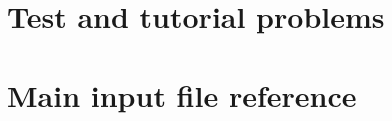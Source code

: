 \documentclass[12pt,a4paper]{report}
\begin{document}
\chapter{Test and tutorial problems}


\chapter{Main input file reference}



%
%

\def\AddDoc#1{}

\newenvironment{RecordType}[5]
{
 \ifstrequal{#4}{\relax}{%
    \begingroup
    \gdef\KeyItem##1##2##3##4##5{}
 }{
    \par
    \vskip 2ex
    \hrule%
    \vskip 0.3ex
    \hrule
    \noindent%
    record: {\bf #1}%
    \ifstrempty{#2}{}{ implements abstract type: #2}%
    \ifstrempty{#3}{}{ constructible from key: #3}%
    {#4}
    \par%
    \vskip 0.5ex
    \hrule%
    \vskip 0.3ex
    \hrule
    {#5}
    \begingroup%
    \addtolength{\leftskip}{3em}%
    \gdef\KeyItem##1##2##3##4##5{%
        \par
        \vskip 0.3ex
        \noindent%
        \hspace{-3em}{\bf\tt ##1} = {\it \textless ##2\textgreater}%
        \par
        Default: {##3} \hfill [##4]
        \par
        {##5}
    }%
  }
}{%
  \vskip 2ex  
  \endgroup%
}
\end{document}
